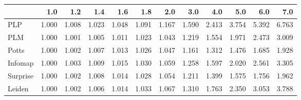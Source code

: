 \begin{tabular}{lrrrrrrrrrrr}
\toprule
{} &   1.0 &   1.2 &   1.4 &   1.6 &   1.8 &   2.0 &   3.0 &   4.0 &   5.0 &   6.0 &   7.0 \\
\midrule
PLP      & 1.000 & 1.008 & 1.023 & 1.048 & 1.091 & 1.167 & 1.590 & 2.413 & 3.754 & 5.392 & 6.763 \\
PLM      & 1.000 & 1.001 & 1.005 & 1.011 & 1.023 & 1.043 & 1.219 & 1.554 & 1.971 & 2.473 & 3.009 \\
Potts    & 1.000 & 1.002 & 1.007 & 1.013 & 1.026 & 1.047 & 1.161 & 1.312 & 1.476 & 1.685 & 1.928 \\
Infomap  & 1.000 & 1.003 & 1.009 & 1.015 & 1.030 & 1.059 & 1.258 & 1.597 & 2.020 & 2.561 & 3.305 \\
Surprise & 1.000 & 1.002 & 1.008 & 1.014 & 1.028 & 1.054 & 1.211 & 1.399 & 1.575 & 1.756 & 1.962 \\
Leiden   & 1.000 & 1.002 & 1.006 & 1.014 & 1.033 & 1.067 & 1.310 & 1.763 & 2.350 & 3.053 & 3.788 \\
\bottomrule
\end{tabular}
